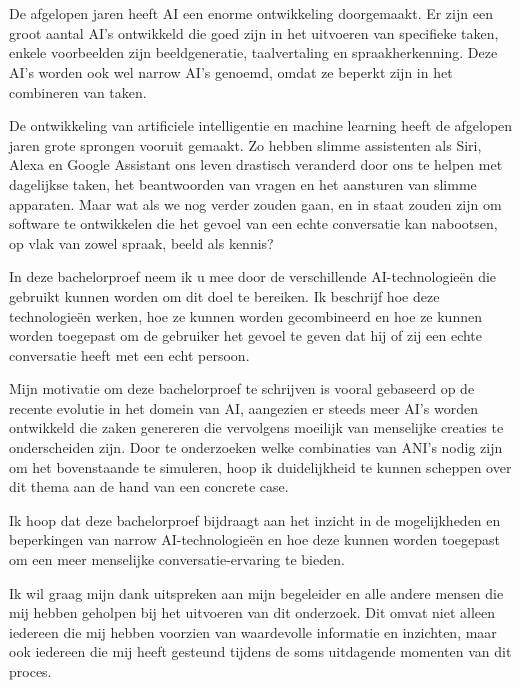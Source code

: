 
\chapter*{}
\label{ch:voorwoord}


De afgelopen jaren heeft AI een enorme ontwikkeling doorgemaakt. Er zijn een groot aantal AI's ontwikkeld die goed zijn in het uitvoeren van specifieke taken, enkele voorbeelden zijn beeldgeneratie, taalvertaling en spraakherkenning. Deze AI's worden ook wel narrow AI's genoemd, omdat ze beperkt zijn in het combineren van taken.

De ontwikkeling van artificiele intelligentie en machine learning heeft de afgelopen jaren grote sprongen vooruit gemaakt. Zo hebben slimme assistenten als Siri, Alexa en Google Assistant ons leven drastisch veranderd door ons te helpen met dagelijkse taken, het beantwoorden van vragen en het aansturen van slimme apparaten. Maar wat als we nog verder zouden gaan, en in staat zouden zijn om software te ontwikkelen die het gevoel van een echte conversatie kan nabootsen, op vlak van zowel spraak, beeld als kennis?

In deze bachelorproef neem ik u mee door de verschillende AI-technologieën die gebruikt kunnen worden om dit doel te bereiken. Ik beschrijf hoe deze technologieën werken, hoe ze kunnen worden gecombineerd en hoe ze kunnen worden toegepast om de gebruiker het gevoel te geven dat hij of zij een echte conversatie heeft met een echt persoon.

Mijn motivatie om deze bachelorproef te schrijven is vooral gebaseerd op de recente evolutie in het domein van AI, aangezien er steeds meer AI's worden ontwikkeld die zaken genereren die vervolgens moeilijk van menselijke creaties te onderscheiden zijn. Door te onderzoeken welke combinaties van ANI's nodig zijn om het bovenstaande te simuleren, hoop ik duidelijkheid te kunnen scheppen over dit thema aan de hand van een concrete case.

Ik hoop dat deze bachelorproef bijdraagt aan het inzicht in de mogelijkheden en beperkingen van narrow AI-technologieën en hoe deze kunnen worden toegepast om een meer menselijke conversatie-ervaring te bieden.

Ik wil graag mijn dank uitspreken aan mijn begeleider en alle andere mensen die mij hebben geholpen bij het uitvoeren van dit onderzoek. Dit omvat niet alleen iedereen die mij hebben voorzien van waardevolle informatie en inzichten, maar ook iedereen die mij heeft gesteund tijdens de soms uitdagende momenten van dit proces.

